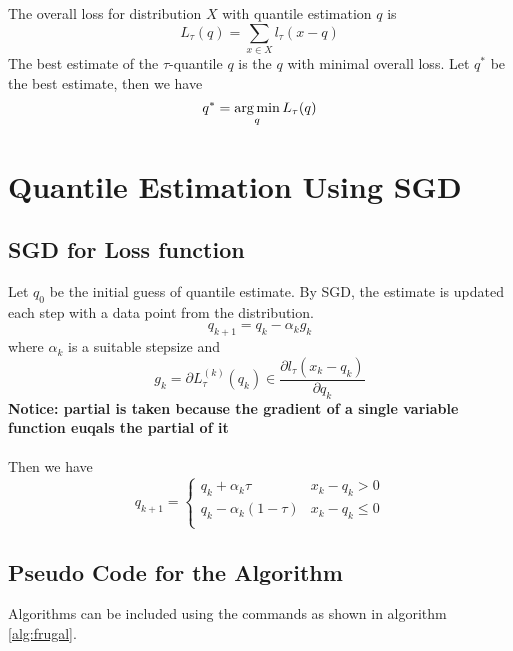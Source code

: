 \documentclass[11pt]{article}
\begin{document}
The overall loss for distribution $X$ with quantile estimation $q$ is
$$
L_{\tau}(q) = \sum_{x \in X} l_{\tau}(x - q)
$$
The best estimate of the $\tau$-quantile $q$ is the $q$ with minimal overall loss. 
Let $q^\ast$ be the best estimate, then we have
$$
q^\ast = \operatorname*{arg\,min}_{q} L_{\tau}(q)
$$


\section{Quantile Estimation Using SGD}

\subsection{SGD for Loss function}

Let $q_0$ be the initial guess of quantile estimate. 
By SGD, the estimate is updated each step with a data point from the distribution.
$$
q_{k+1} = q_k - \alpha_k g_k
$$
where $ \alpha_k $ is a suitable stepsize and 
$$
g_k = \partial L_{\tau}^{(k)}(q_k) \in \frac{\partial l_\tau(x_k - q_k)}{\partial q_k}
$$ 
\textbf{Notice: partial is taken because the gradient of a single variable function
euqals the partial of it}
\\\\
Then we have
$$
q_{k+1} = 
    \begin{cases}
        q_k + \alpha_k \tau               & x_k - q_k > 0\\
        q_k - \alpha_k (1-\tau)           & x_k - q_k \leq 0\\
    \end{cases}
$$

\subsection{Pseudo Code for the Algorithm}

Algorithms can be included using the commands as shown in algorithm \ref{alg:frugal}.
\end{document}
